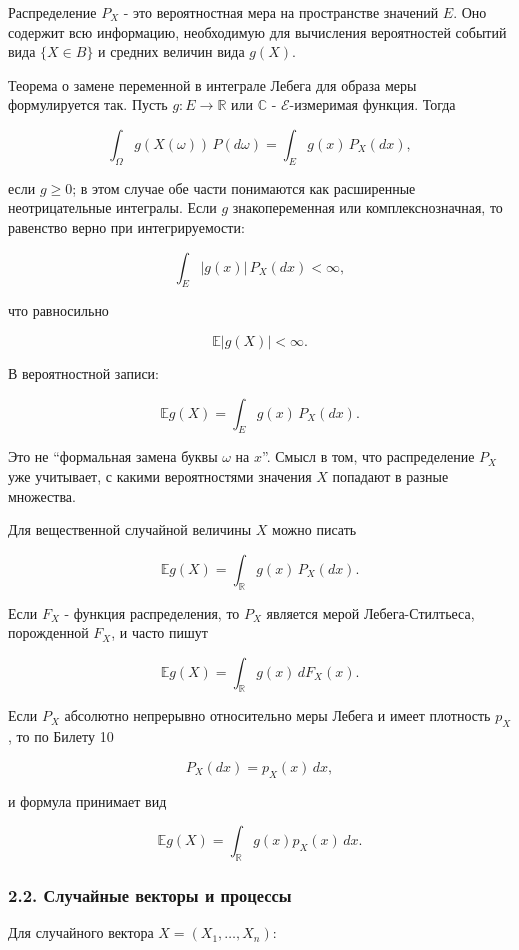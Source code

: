 \documentclass[
  11pt,
  a4paper,
]{article}
\begin{document}
Распределение \(P_X\) - это вероятностная мера на пространстве значений
\(E\). Оно содержит всю информацию, необходимую для вычисления
вероятностей событий вида \(\{X\in B\}\) и средних величин вида
\(g(X)\).

Теорема о замене переменной в интеграле Лебега для образа меры
формулируется так. Пусть \(g:E\to\mathbb R\) или \(\mathbb C\) -
\(\mathcal E\)-измеримая функция. Тогда

\[
\int_\Omega g(X(\omega))\,P(d\omega)
=
\int_E g(x)\,P_X(dx),
\]

если \(g\ge0\); в этом случае обе части понимаются как расширенные
неотрицательные интегралы. Если \(g\) знакопеременная или
комплекснозначная, то равенство верно при интегрируемости:

\[
\int_E |g(x)|\,P_X(dx)<\infty,
\]

что равносильно

\[
\mathbb E|g(X)|<\infty.
\]

В вероятностной записи:

\[
\mathbb E g(X)=\int_E g(x)\,P_X(dx).
\]

Это не ``формальная замена буквы \(\omega\) на \(x\)''. Смысл в том, что
распределение \(P_X\) уже учитывает, с какими вероятностями значения
\(X\) попадают в разные множества.

Для вещественной случайной величины \(X\) можно писать

\[
\mathbb E g(X)=\int_{\mathbb R} g(x)\,P_X(dx).
\]

Если \(F_X\) - функция распределения, то \(P_X\) является мерой
Лебега-Стилтьеса, порожденной \(F_X\), и часто пишут

\[
\mathbb E g(X)=\int_{\mathbb R} g(x)\,dF_X(x).
\]

Если \(P_X\) абсолютно непрерывно относительно меры Лебега и имеет
плотность \(p_X\), то по Билету 10

\[
P_X(dx)=p_X(x)\,dx,
\]

и формула принимает вид

\[
\mathbb E g(X)=\int_{\mathbb R} g(x)p_X(x)\,dx.
\]

\subsubsection{2.2. Случайные векторы и
процессы}\label{ux441ux43bux443ux447ux430ux439ux43dux44bux435-ux432ux435ux43aux442ux43eux440ux44b-ux438-ux43fux440ux43eux446ux435ux441ux441ux44b}

Для случайного вектора \(X=(X_1,\ldots,X_n)\):
\end{document}
